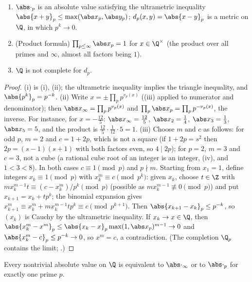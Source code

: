 \begin{proposition}\label{prop:rings:padic-abs}
\begin{enumerate}[label=(\roman*)]
\item $\abs\cdot_p$ is an absolute value satisfying the ultrametric inequality $\abs{x+y}_p\le\max(\abs x_p,\abs y_p)$; $d_p(x,y)=\abs{x-y}_p$ is a metric on $\Q$, in
which $p^k\to0$.
\item (Product formula) $\prod_{p\le\infty}\abs x_p=1$ for $x\in\Q^\times$ (the product over all primes and $\infty$, almost all factors being $1$).
\item $\Q$ is not complete for $d_p$.
\end{enumerate}
\end{proposition}

\begin{proof}
(i) is (i), (ii); the ultrametric inequality implies the triangle inequality, and $\abs{p^k}_p=p^{-k}$.
(ii) Write $x=\pm\prod_pp^{v_p(x)}$ ((iii) applied to numerator and denominator); then $\abs x_\infty=\prod_pp^{v_p(x)}$ and
$\prod_p\abs x_p=\prod_pp^{-v_p(x)}$, the inverse. For instance, for $x=-\frac{12}5$: $\abs x_\infty=\frac{12}5$, $\abs x_2=\frac14$, $\abs x_3=\frac13$, $\abs x_5=5$, and the product
is $\frac{12}5\cdot\frac1{12}\cdot5=1$.
(iii) Choose $m$ and $c$ as follows: for odd $p$, $m=2$ and $c=1+2p$, which is not a square (if $1+2p=s^2$ then $2p=(s-1)(s+1)$ with both factors
even, so $4\mid2p$); for $p=2$, $m=3$ and $c=3$, not a cube (a rational cube root of an integer is an integer, (iv), and
$1<3<8$). In both cases $c\equiv1\pmod p$ and $p\nmid m$. Starting from $x_1=1$, define integers $x_k\equiv1\pmod p$ with $x_k^m\equiv c\pmod{p^k}$: given $x_k$, choose
$t\in\Z$ with $mx_k^{m-1}t\equiv(c-x_k^m)/p^k\pmod p$ (possible as $mx_k^{m-1}\not\equiv0\pmod p$) and put $x_{k+1}=x_k+tp^k$; the binomial expansion gives
$x_{k+1}^m\equiv x_k^m+mx_k^{m-1}tp^k\equiv c\pmod{p^{k+1}}$. Then $\abs{x_{k+1}-x_k}_p\le p^{-k}$, so $(x_k)$ is Cauchy by the ultrametric inequality. If $x_k\to x\in\Q$, then
$\abs{x_k^m-x^m}_p\le\abs{x_k-x}_p\max(1,\abs x_p)^{m-1}\to0$ and $\abs{x_k^m-c}_p\le p^{-k}\to0$, so $x^m=c$, a contradiction. (The completion $\Q_p$ contains the limit;
.)
\end{proof}

\begin{theorem}[Ostrowski]\label{thm:rings:ostrowski}
Every nontrivial absolute value on $\Q$ is equivalent to $\abs\cdot_\infty$ or to $\abs\cdot_p$ for exactly one prime $p$.
\end{theorem}

